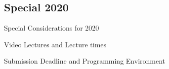 \subsection{Special 2020}
\begin{frame}{Special Considerations for 2020}
\end{frame}

\begin{frame}{Video Lectures and Lecture times}
\end{frame}

\begin{frame}{Submission Deadline and Programming Environment}
\end{frame}


%
%
%


